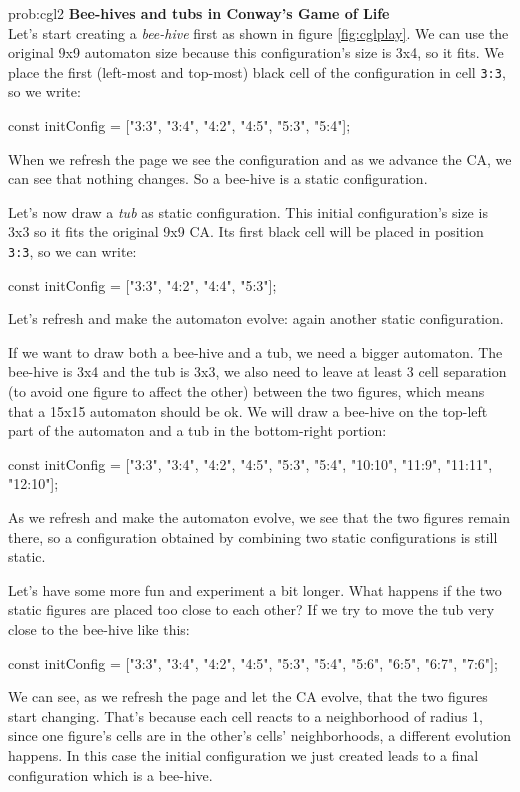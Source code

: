 \begin{sol}{prob:cgl2}
\textbf{Bee-hives and tubs in Conway's Game of Life}\\
Let's start creating a \textit{bee-hive} first as shown in figure \ref{fig:cglplay}. We can use
the original 9x9 automaton size because this configuration's size is 3x4, so it fits.
We place the first (left-most and top-most) black cell of the configuration in cell \texttt{3:3},
so we write:
\begin{code}
const initConfig = ["3:3", "3:4", "4:2", "4:5", "5:3", "5:4"];
\end{code}
When we refresh the page we see the configuration and as we advance the CA, we can see that
nothing changes. So a bee-hive is a static configuration.

Let's now draw a \textit{tub} as static configuration.
This initial configuration's size is 3x3 so it fits the original 9x9 CA.
Its first black cell will be placed in position \texttt{3:3}, so we can write:
\begin{code}
const initConfig = ["3:3", "4:2", "4:4", "5:3"];
\end{code}
Let's refresh and make the automaton evolve: again another static configuration.

If we want to draw both a bee-hive and a tub, we need a bigger automaton. The bee-hive
is 3x4 and the tub is 3x3, we also need to leave at least 3 cell separation
(to avoid one figure to affect the other) between the two figures, which means that a
15x15 automaton should be ok. We will draw a bee-hive on the top-left part of the automaton
and a tub in the bottom-right portion:
\begin{code}
const initConfig = ["3:3", "3:4", "4:2", "4:5", "5:3", "5:4", "10:10", "11:9", "11:11", "12:10"];
\end{code}
As we refresh and make the automaton evolve, we see that the two figures remain there, so a
configuration obtained by combining two static configurations is still static.

Let's have some more fun and experiment a bit longer. What happens if the two static figures
are placed too close to each other? If we try to move the tub very close to the bee-hive like this:
\begin{code}
const initConfig = ["3:3", "3:4", "4:2", "4:5", "5:3", "5:4", "5:6", "6:5", "6:7", "7:6"];
\end{code}
We can see, as we refresh the page and let the CA evolve, that the two figures start changing.
That's because each cell reacts to a neighborhood of radius 1, since one figure's cells are
in the other's cells' neighborhoods, a different evolution happens. In this case the initial configuration
we just created leads to a final configuration which is a bee-hive.
\end{sol}

